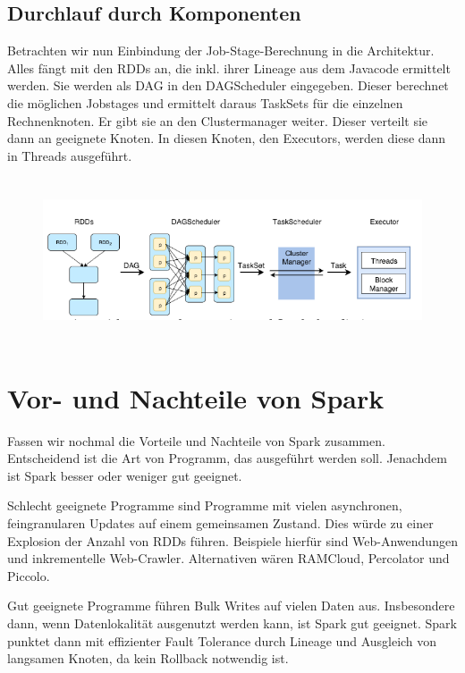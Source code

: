 \documentclass[letterpaper]{article}
\begin{document}
\bigskip

\subsection[Durchlauf durch
Komponenten]{\rmfamily Durchlauf durch
Komponenten}
Betrachten wir nun Einbindung der Job-Stage-Berechnung in die
Architektur. Alles fängt mit den RDDs an, die inkl. ihrer Lineage aus
dem Javacode ermittelt werden. Sie werden als DAG in den DAGScheduler
eingegeben. Dieser berechnet die möglichen Jobstages und ermittelt
daraus TaskSets für die einzelnen Rechnenknoten. Er gibt sie an den
Clustermanager weiter. Dieser verteilt sie dann an geeignete Knoten. In
diesen Knoten, den Executors, werden diese dann in Threads ausgeführt. 

\begin{figure}
\centering
\includegraphics[width=15.24cm,height=4.856cm]{bilder/Seminartext-img3.png}
\end{figure}

\bigskip

\section[Vor{}- und Nachteile von
Spark]{\rmfamily Vor- und Nachteile von Spark}
Fassen wir nochmal die Vorteile und Nachteile von Spark zusammen.
Entscheidend ist die Art von Programm, das ausgeführt werden soll.
Jenachdem ist Spark besser oder weniger gut geeignet.

Schlecht geeignete Programme sind Programme mit vielen asynchronen,
feingranularen Updates auf einem gemeinsamen Zustand. Dies würde zu
einer Explosion der Anzahl von RDDs führen. Beispiele hierfür sind
Web-Anwendungen und inkrementelle Web-Crawler. Alternativen wären
RAMCloud, Percolator und Piccolo.

Gut geeignete Programme führen Bulk Writes auf vielen Daten aus.
Insbesondere dann, wenn Datenlokalität ausgenutzt werden kann, ist
Spark gut geeignet. Spark punktet dann mit effizienter Fault Tolerance
durch Lineage und Ausgleich von langsamen Knoten, da kein Rollback
notwendig ist.
\end{document}
